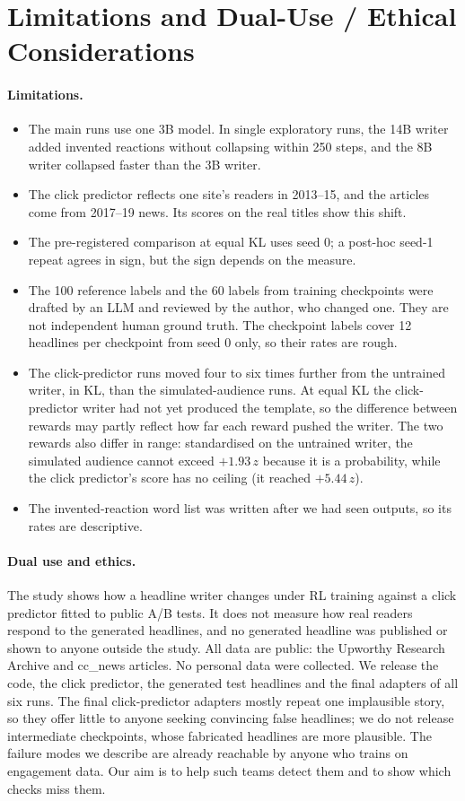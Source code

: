 \section{Limitations and Dual-Use / Ethical Considerations}\label{app:limits}
\paragraph{Limitations.}
\begin{itemize}
\item The main runs use one 3B model. In single exploratory runs, the 14B writer added invented reactions without collapsing within 250 steps, and the 8B writer collapsed faster than the 3B writer.
\item The click predictor reflects one site's readers in 2013--15, and the articles come from 2017--19 news. Its scores on the real titles show this shift.
\item The pre-registered comparison at equal KL uses seed 0; a post-hoc seed-1 repeat agrees in sign, but the sign depends on the measure.
\item The 100 reference labels and the 60 labels from training checkpoints were drafted by an LLM and reviewed by the author, who changed one. They are not independent human ground truth. The checkpoint labels cover 12 headlines per checkpoint from seed 0 only, so their rates are rough.
\item The click-predictor runs moved four to six times further from the untrained writer, in KL, than the simulated-audience runs. At equal KL the click-predictor writer had not yet produced the template, so the difference between rewards may partly reflect how far each reward pushed the writer. The two rewards also differ in range: standardised on the untrained writer, the simulated audience cannot exceed $+1.93\,z$ because it is a probability, while the click predictor's score has no ceiling (it reached $+5.44\,z$).
\item The invented-reaction word list was written after we had seen outputs, so its rates are descriptive.
\end{itemize}

\paragraph{Dual use and ethics.}
The study shows how a headline writer changes under RL training against a click predictor fitted to public A/B tests. It does not measure how real readers respond to the generated headlines, and no generated headline was published or shown to anyone outside the study. All data are public: the Upworthy Research Archive and cc\_news articles. No personal data were collected. We release the code, the click predictor, the generated test headlines and the final adapters of all six runs. The final click-predictor adapters mostly repeat one implausible story, so they offer little to anyone seeking convincing false headlines; we do not release intermediate checkpoints, whose fabricated headlines are more plausible. The failure modes we describe are already reachable by anyone who trains on engagement data. Our aim is to help such teams detect them and to show which checks miss them.
